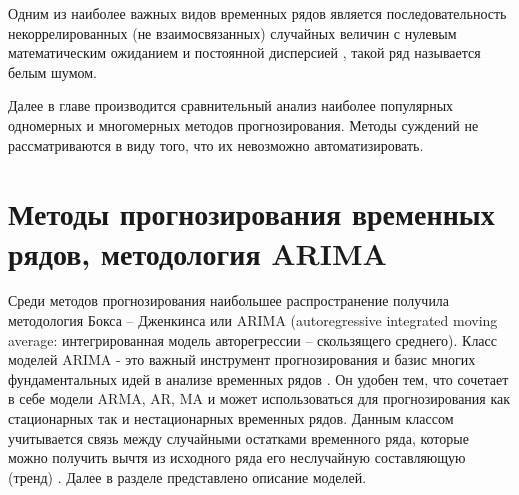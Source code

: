 \documentclass[a4paper,14pt,russian]{extreport}
\begin{document}
Одним из наиболее важных видов временных рядов является 
последовательность некоррелированных (не взаимосвязанных) случайных 
величин с нулевым математическим ожиданием и постоянной дисперсией 
\cite{fuller1996, runova2013}, такой ряд называется белым шумом.

Далее в главе производится сравнительный анализ наиболее популярных 
одномерных и многомерных методов прогнозирования. Методы суждений не 
рассматриваются в виду того, что их невозможно автоматизировать.

\section{Методы прогнозирования временных рядов, методология ARIMA} 
Среди методов прогнозирования наибольшее распространение получила 
методология Бокса -- Дженкинса или ARIMA (autoregressive integrated moving 
average: интегрированная модель авторегрессии -- скользящего среднего). Класс 
моделей ARIMA - это важный инструмент прогнозирования и базис многих 
фундаментальных идей в анализе временных рядов \cite{chatfield2000}. Он 
удобен тем, что сочетает в себе модели ARMA, AR, MA и может использоваться 
для прогнозирования как стационарных так и нестационарных временных рядов. 
Данным классом учитывается связь между случайными остатками временного 
ряда, которые можно получить вычтя из исходного ряда его неслучайную 
составляющую (тренд) \cite{tihonov2006}. Далее в разделе представлено описание 
моделей.
\end{document}
